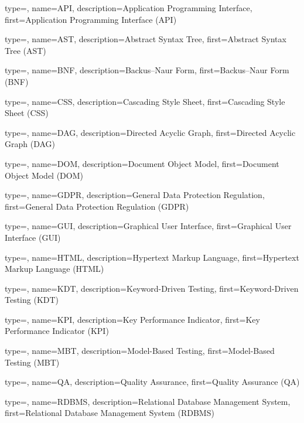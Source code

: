 
{
	type=\acronymtype,
	name={API},
	description={Application Programming Interface},
	first={Application Programming Interface (API)}
}

{
	type=\acronymtype,
	name={AST},
	description={Abstract Syntax Tree},
	first={Abstract Syntax Tree (AST)}
}

{
	type=\acronymtype,
	name={BNF},
	description={Backus–Naur Form},
	first={Backus–Naur Form (BNF)}
}

{
	type=\acronymtype,
	name={CSS},
	description={Cascading Style Sheet},
	first={Cascading Style Sheet (CSS)}
}

{
	type=\acronymtype,
	name={DAG},
	description={Directed Acyclic Graph},
	first={Directed Acyclic Graph (DAG)}
}

{
	type=\acronymtype,
	name={DOM},
	description={Document Object Model},
	first={Document Object Model (DOM)}
}

{
	type=\acronymtype,
	name={GDPR},
	description={General Data Protection Regulation},
	first={General Data Protection Regulation (GDPR)}
}

{
	type=\acronymtype,
	name={GUI},
	description={Graphical User Interface},
	first={Graphical User Interface (GUI)}
}



{
	type=\acronymtype,
	name={HTML},
	description={Hypertext Markup Language},
	first={Hypertext Markup Language (HTML)}
}

{
	type=\acronymtype,
	name={KDT},
	description={Keyword-Driven Testing},
	first={Keyword-Driven Testing (KDT)}
}

{
	type=\acronymtype,
	name={KPI},
	description={Key Performance Indicator},
	first={Key Performance Indicator (KPI)}
}

{
	type=\acronymtype,
	name={MBT},
	description={Model-Based Testing},
	first={Model-Based Testing (MBT)}
}

{
	type=\acronymtype,
	name={QA},
	description={Quality Assurance},
	first={Quality Assurance (QA)}
}

{
	type=\acronymtype,
	name={RDBMS},
	description={Relational Database Management System},
	first={Relational Database Management System (RDBMS)}
}



